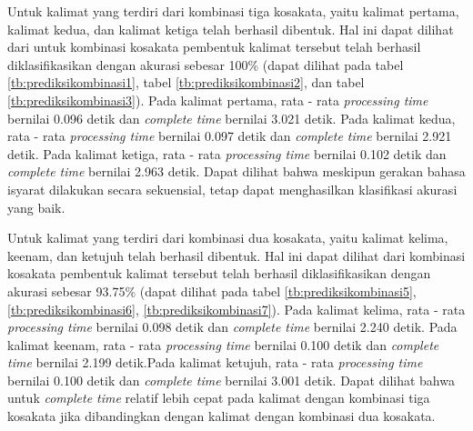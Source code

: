 
Untuk kalimat yang terdiri dari kombinasi tiga kosakata, yaitu kalimat pertama, kalimat kedua, dan kalimat ketiga telah berhasil dibentuk. Hal ini dapat dilihat dari untuk kombinasi kosakata pembentuk kalimat tersebut telah berhasil diklasifikasikan dengan akurasi sebesar 100\% (dapat dilihat pada tabel \ref{tb:prediksikombinasi1}, tabel \ref{tb:prediksikombinasi2}, dan tabel \ref{tb:prediksikombinasi3}). Pada kalimat pertama, rata - rata \emph{processing time} bernilai 0.096 detik dan \emph{complete time} bernilai 3.021 detik. Pada kalimat kedua, rata - rata \emph{processing time} bernilai 0.097 detik dan \emph{complete time} bernilai 2.921 detik. Pada kalimat ketiga, rata - rata \emph{processing time} bernilai 0.102 detik dan \emph{complete time} bernilai 2.963 detik. Dapat dilihat bahwa meskipun gerakan bahasa isyarat dilakukan secara sekuensial, tetap dapat menghasilkan klasifikasi akurasi yang baik.

Untuk kalimat yang terdiri dari kombinasi dua kosakata, yaitu kalimat kelima, keenam, dan ketujuh telah berhasil dibentuk. Hal ini dapat dilihat dari kombinasi kosakata pembentuk kalimat tersebut telah berhasil diklasifikasikan dengan akurasi sebesar 93.75\% (dapat dilihat pada tabel \ref{tb:prediksikombinasi5}, \ref{tb:prediksikombinasi6}, \ref{tb:prediksikombinasi7}). Pada kalimat kelima, rata - rata \emph{processing time} bernilai 0.098 detik dan \emph{complete time} bernilai 2.240 detik. Pada kalimat keenam, rata - rata \emph{processing time} bernilai 0.100 detik dan \emph{complete time} bernilai 2.199 detik.Pada kalimat ketujuh, rata - rata \emph{processing time} bernilai 0.100 detik dan \emph{complete time} bernilai 3.001 detik. Dapat dilihat bahwa untuk \emph{complete time} relatif lebih cepat pada kalimat dengan kombinasi tiga kosakata jika dibandingkan dengan kalimat dengan kombinasi dua kosakata.

